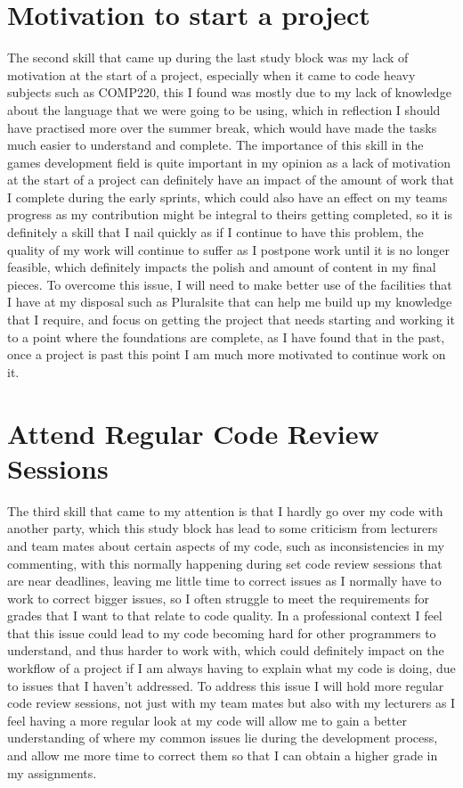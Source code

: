 \documentclass{scrartcl}
\begin{document}
\section{Motivation to start a project}
The second skill that came up during the last study block was my lack of motivation at the start of a project, especially when it came to code heavy subjects such as COMP220, this I found was mostly due to my lack of knowledge about the language that we were going to be using, which in reflection I should have practised more over the summer break, which would have made the tasks much easier to understand and complete. The importance of this skill in the games development field is quite important in my opinion as a lack of motivation at the start of a project can definitely have an impact of the amount of work that I complete during the early sprints, which could also have an effect on my teams progress as my contribution might be integral to theirs getting completed, so it is definitely a skill that I nail quickly as if I continue to have this problem, the quality of my work will continue to suffer as I postpone work until it is no longer feasible, which definitely impacts the polish and amount of content in my final pieces. To overcome this issue, I will need to make better use of the facilities that I have at my disposal such as Pluralsite that can help me build up my knowledge that I require, and focus on getting the project that needs starting and working it to a point where the foundations are complete, as I have found that in the past, once a project is past this point I am much more motivated to continue work on it.

\section{Attend Regular Code Review Sessions}
The third skill that came to my attention is that I hardly go over my code with another party, which this study block has lead to some criticism from lecturers and team mates about certain aspects of my code, such as inconsistencies in my commenting, with this normally happening during set code review sessions that are near deadlines, leaving me little time to correct issues as I normally have to work to correct bigger issues, so I often struggle to meet the requirements for grades that I want to that relate to code quality. In a professional context I feel that this issue could lead to my code becoming hard for other programmers to understand, and thus harder to work with, which could definitely impact on the workflow of a project if I am always having to explain what my code is doing, due to issues that I haven't addressed. To address this issue I will hold more regular code review sessions, not just with my team mates but also with my lecturers as I feel having a more regular look at my code will allow me to gain a better understanding of where my common issues lie during the development process, and allow me more time to correct them so that I can obtain a higher grade in my assignments. 
\end{document}
